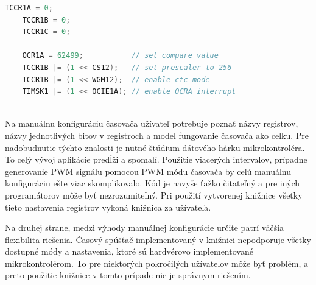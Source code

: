 \begin{lstlisting}[language=c++]      
    TCCR1A = 0;
    TCCR1B = 0;
    TCCR1C = 0;

    OCR1A = 62499;           // set compare value
    TCCR1B |= (1 << CS12);   // set prescaler to 256
    TCCR1B |= (1 << WGM12);  // enable ctc mode
    TIMSK1 |= (1 << OCIE1A); // enable OCRA interrupt
    
\end{lstlisting}

Na manuálnu konfiguráciu časovača užívateľ potrebuje poznať názvy registrov, názvy jednotlivých bitov  v registroch a model fungovanie časovača ako celku. Pre nadobudnutie
týchto znalosti je nutné štúdium dátového hárku mikrokontroléra. To celý vývoj aplikácie predĺži a spomalí. Použitie viacerých intervalov,
prípadne generovanie  PWM signálu pomocou PWM módu časovača by celú
manuálnu konfiguráciu ešte viac skomplikovalo. Kód je navyše ťažko čitateľný a pre iných programátorov
môže byť nezrozumiteľný. Pri použití vytvorenej knižnice všetky tieto nastavenia registrov vykoná knižnica za užívateľa. \par
Na druhej strane, medzi výhody manuálnej konfigurácie určite patrí väčšia flexibilita riešenia. Časový spúšťač implementovaný v knižnici nepodporuje všetky dostupné
módy a nastavenia, ktoré sú hardvérovo implementované mikrokontrolérom. To pre niektorých pokročilých užívateľov môže byť problém, a preto použitie knižnice
v tomto prípade nie je správnym riešením.

